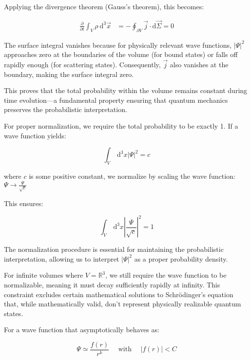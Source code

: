 \documentclass[italian]{HKNdocument}
\begin{document}
Applying the divergence theorem (Gauss's theorem), this becomes:

\begin{align*}
\frac{\partial}{\partial t} \int_{V} \rho \mathrm{~d}^{3} \vec{x} &= -\oint_{\partial V} \vec{j} \cdot \mathrm{d} \vec{\Sigma} = 0
\end{align*}

The surface integral vanishes because for physically relevant wave functions, $|\Psi|^2$ approaches zero at the boundaries of the volume (for bound states) or falls off rapidly enough (for scattering states). Consequently, $\vec{j}$ also vanishes at the boundary, making the surface integral zero.

This proves that the total probability within the volume remains constant during time evolution—a fundamental property ensuring that quantum mechanics preserves the probabilistic interpretation.

For proper normalization, we require the total probability to be exactly 1. If a wave function yields:

\begin{equation*}
\int_{V} \mathrm{~d}^{3} x|\Psi|^{2}=c \tag{1.38}
\end{equation*}

where $c$ is some positive constant, we normalize by scaling the wave function:
$\Psi \rightarrow \frac{\Psi}{\sqrt{c}}$

This ensures:

\begin{equation*}
\int_{V} \mathrm{~d}^{3} x\left|\frac{\Psi}{\sqrt{c}}\right|^{2}=1 \tag{1.39}
\end{equation*}

The normalization procedure is essential for maintaining the probabilistic interpretation, allowing us to interpret $|\Psi|^2$ as a proper probability density.

For infinite volumes where $V=\mathbb{R}^{3}$, we still require the wave function to be normalizable, meaning it must decay sufficiently rapidly at infinity. This constraint excludes certain mathematical solutions to Schrödinger's equation that, while mathematically valid, don't represent physically realizable quantum states.


For a wave function that asymptotically behaves as:

\begin{equation*}
\Psi \simeq \frac{f(r)}{r^{k}} \quad \text { with } \quad|f(r)|<C \tag{1.40}
\end{equation*}
\end{document}
